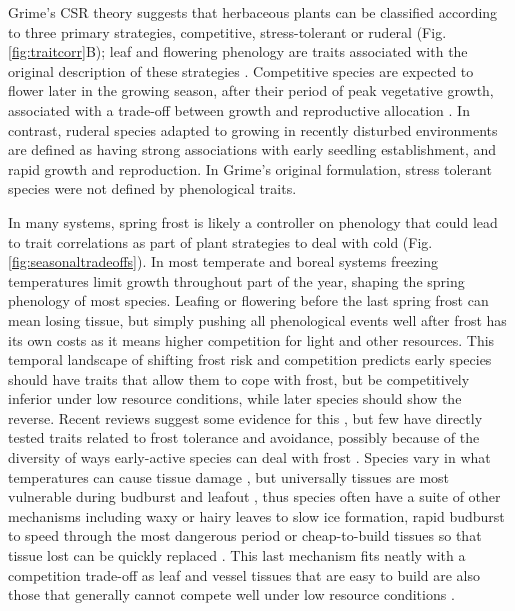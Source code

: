 \documentclass[11pt]{article}
\begin{document}
Grime's CSR theory \citep{grime1977evidence} suggests that herbaceous plants can be classified according to three primary strategies, competitive, stress-tolerant or ruderal (Fig. \ref{fig:traitcorr}B); leaf and flowering phenology are traits associated with the original description of these strategies \citep[see Table 2 in][]{grime1977evidence}. Competitive species are expected to flower later in the growing season, after their period of peak vegetative growth,  associated with a trade-off between growth and reproductive allocation \citep{law1979cost}. In contrast, ruderal species adapted to growing in recently disturbed environments are defined as having strong associations with early seedling establishment, and rapid growth and reproduction. In Grime’s original formulation, stress tolerant species were not defined by phenological traits.

In many systems, spring frost is likely a controller on phenology that could lead to trait correlations as part of plant strategies to deal with cold (Fig. \ref{fig:seasonaltradeoffs}). In most temperate and boreal systems freezing temperatures limit growth throughout part of the year, shaping the spring phenology of most species. Leafing or flowering before the last spring frost can mean losing tissue, but simply pushing all phenological events well after frost has its own costs as it means higher competition for light and other resources.  This temporal landscape of shifting frost risk and competition predicts early species should have traits that allow them to cope with frost, but be competitively inferior under low resource conditions, while later species should show the reverse. Recent reviews suggest some evidence for this \citep{wolkovich2014aob,wolkovich2021phenological}, but few have directly tested traits related to frost tolerance and avoidance, possibly because of the diversity of ways early-active species can deal with frost \citep{frostbook}. Species vary in what temperatures can cause tissue damage \citep{Lenz2013}, but universally tissues are most vulnerable during budburst and leafout \citep{frostbook,vitasse2014earlier,cat2019}, thus species often have a suite of other mechanisms including waxy or hairy leaves to slow ice formation, rapid budburst to speed through the most dangerous period or cheap-to-build tissues so that tissue lost can be quickly replaced \citep{frostbook}. This last mechanism fits neatly with a competition trade-off as leaf and vessel tissues that are easy to build are also those that generally cannot compete well under low resource conditions \citep{larcher1980,diaz2016global}. 
\end{document}
